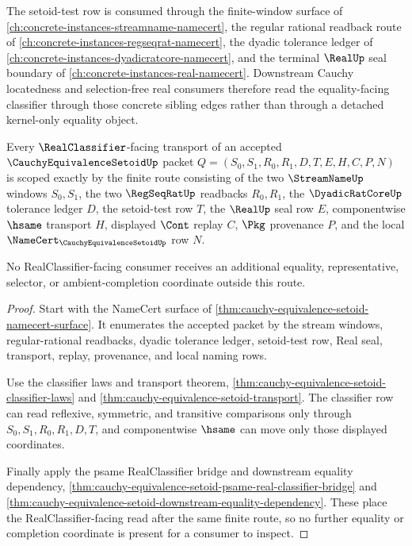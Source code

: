 The setoid-test row is consumed through the finite-window surface of \autoref{ch:concrete-instances-streamname-namecert}, the regular rational readback route of \autoref{ch:concrete-instances-regseqrat-namecert}, the dyadic tolerance ledger of \autoref{ch:concrete-instances-dyadicratcore-namecert}, and the terminal $\RealUp$ seal boundary of \autoref{ch:concrete-instances-real-namecert}. Downstream Cauchy locatedness and selection-free real consumers therefore read the equality-facing classifier through those concrete sibling edges rather than through a detached kernel-only equality object.

\begin{theorem}
\label{thm:cauchy-equivalence-setoid-real-classifier-transport-scope}
Every $\RealClassifier$-facing transport of an accepted $\CauchyEquivalenceSetoidUp$ packet $Q=(S_0,S_1,R_0,R_1,D,T,E,H,C,P,N)$ is scoped exactly by the finite route consisting of the two $\StreamNameUp$ windows $S_0,S_1$, the two $\RegSeqRatUp$ readbacks $R_0,R_1$, the $\DyadicRatCoreUp$ tolerance ledger $D$, the setoid-test row $T$, the $\RealUp$ seal row $E$, componentwise $\hsame$ transport $H$, displayed $\Cont$ replay $C$, $\Pkg$ provenance $P$, and the local $\NameCert_{\CauchyEquivalenceSetoidUp}$ row $N$.

No RealClassifier-facing consumer receives an additional equality, representative, selector, or ambient-completion coordinate outside this route.
\end{theorem}
\begin{proof}
Start with the NameCert surface of \autoref{thm:cauchy-equivalence-setoid-namecert-surface}. It enumerates the accepted packet by the stream windows, regular-rational readbacks, dyadic tolerance ledger, setoid-test row, Real seal, transport, replay, provenance, and local naming rows.

Use the classifier laws and transport theorem, \autoref{thm:cauchy-equivalence-setoid-classifier-laws} and \autoref{thm:cauchy-equivalence-setoid-transport}. The classifier row can read reflexive, symmetric, and transitive comparisons only through $S_0,S_1,R_0,R_1,D,T$, and componentwise $\hsame$ can move only those displayed coordinates.

Finally apply the psame RealClassifier bridge and downstream equality dependency, \autoref{thm:cauchy-equivalence-setoid-psame-real-classifier-bridge} and \autoref{thm:cauchy-equivalence-setoid-downstream-equality-dependency}. These place the RealClassifier-facing read after the same finite route, so no further equality or completion coordinate is present for a consumer to inspect.
\end{proof}

